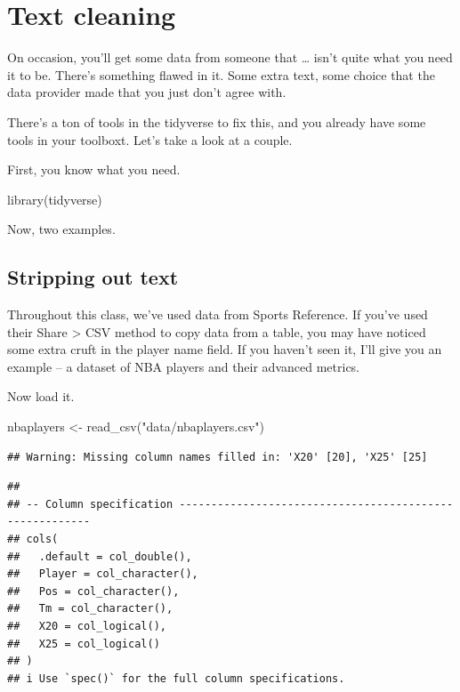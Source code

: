 \documentclass[
]{book}
\newenvironment{Shaded}{\begin{snugshade}}{\end{snugshade}}
\newcommand{\FunctionTok}[1]{\textcolor[rgb]{0.00,0.00,0.00}{#1}}
\newcommand{\NormalTok}[1]{#1}
\newcommand{\OtherTok}[1]{\textcolor[rgb]{0.56,0.35,0.01}{#1}}
\newcommand{\StringTok}[1]{\textcolor[rgb]{0.31,0.60,0.02}{#1}}
\begin{document}
\hypertarget{text-cleaning}{%
\chapter{Text cleaning}\label{text-cleaning}}

On occasion, you'll get some data from someone that \ldots{} isn't quite what you need it to be. There's something flawed in it. Some extra text, some choice that the data provider made that you just don't agree with.

There's a ton of tools in the tidyverse to fix this, and you already have some tools in your toolboxt. Let's take a look at a couple.

First, you know what you need.

\begin{Shaded}
\begin{Highlighting}[]
\FunctionTok{library}\NormalTok{(tidyverse)}
\end{Highlighting}
\end{Shaded}

Now, two examples.

\hypertarget{stripping-out-text}{%
\section{Stripping out text}\label{stripping-out-text}}

Throughout this class, we've used data from Sports Reference. If you've used their Share \textgreater{} CSV method to copy data from a table, you may have noticed some extra cruft in the player name field. If you haven't seen it, I'll give you an example -- a dataset of NBA players and their advanced metrics.

Now load it.

\begin{Shaded}
\begin{Highlighting}[]
\NormalTok{nbaplayers }\OtherTok{\textless{}{-}} \FunctionTok{read\_csv}\NormalTok{(}\StringTok{"data/nbaplayers.csv"}\NormalTok{)}
\end{Highlighting}
\end{Shaded}

\begin{verbatim}
## Warning: Missing column names filled in: 'X20' [20], 'X25' [25]
\end{verbatim}

\begin{verbatim}
## 
## -- Column specification --------------------------------------------------------
## cols(
##   .default = col_double(),
##   Player = col_character(),
##   Pos = col_character(),
##   Tm = col_character(),
##   X20 = col_logical(),
##   X25 = col_logical()
## )
## i Use `spec()` for the full column specifications.
\end{verbatim}
\end{document}
